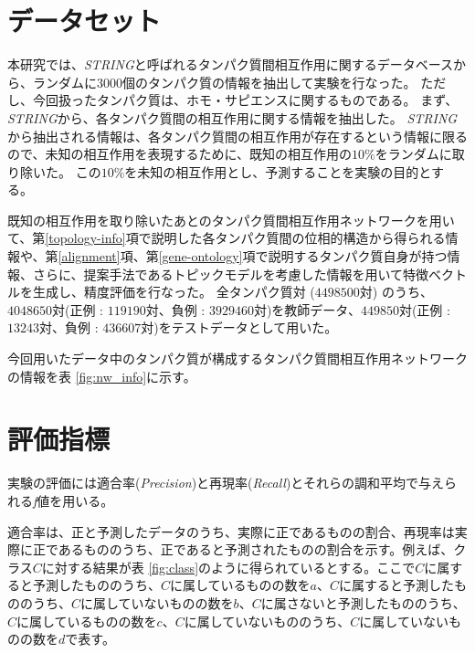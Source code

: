 \documentclass[titlepage,12pt]{jreport}
\begin{document}
\section{データセット\label{dataset}}
本研究では、{\it STRING}\cite{STRING17}と呼ばれるタンパク質間相互作用に関するデータベースから、ランダムに3000個のタンパク質の情報を抽出して実験を行なった。 ただし、今回扱ったタンパク質は、ホモ・サピエンスに関するものである。 まず、{\it STRING}から、各タンパク質間の相互作用に関する情報を抽出した。 {\it STRING}から抽出される情報は、各タンパク質間の相互作用が存在するという情報に限るので、未知の相互作用を表現するために、既知の相互作用の$10\%$をランダムに取り除いた。 この$10\%$を未知の相互作用とし、予測することを実験の目的とする。

既知の相互作用を取り除いたあとのタンパク質間相互作用ネットワークを用いて、第\ref{topology-info}項で説明した各タンパク質間の位相的構造から得られる情報や、第\ref{alignment}項、第\ref{gene-ontology}項で説明するタンパク質自身が持つ情報、さらに、提案手法であるトピックモデルを考慮した情報を用いて特徴ベクトルを生成し、精度評価を行なった。 全タンパク質対 ($4498500$対) のうち、$4048650$対(正例 : $119190$対、負例 : $3929460$対)を教師データ、$449850$対(正例 : $13243$対、負例 : $436607$対)をテストデータとして用いた。

今回用いたデータ中のタンパク質が構成するタンパク質間相互作用ネットワークの情報を表 \ref{fig:nw_info}に示す。

\begin{table}[htb]
	\begin{center}
		\caption{タンパク質間相互作用ネットワークの情報}
		\label{fig:nw_info}
	\end{center}
\end{table}
		

\section{評価指標\label{performance-index}}
実験の評価には適合率({\it Precision})と再現率({\it Recall})とそれらの調和平均で与えられる{\it f}値を用いる。

適合率は、正と予測したデータのうち、実際に正であるものの割合、再現率は実際に正であるもののうち、正であると予測されたものの割合を示す。例えば、クラス$C$に対する結果が表 \ref{fig:class}のように得られているとする。ここで$C$に属すると予測したもののうち、$C$に属しているものの数を$a$、$C$に属すると予測したもののうち、$C$に属していないものの数を$b$、$C$に属さないと予測したもののうち、$C$に属しているものの数を$c$、$C$に属していないもののうち、$C$に属していないものの数を$d$で表す。
\end{document}
